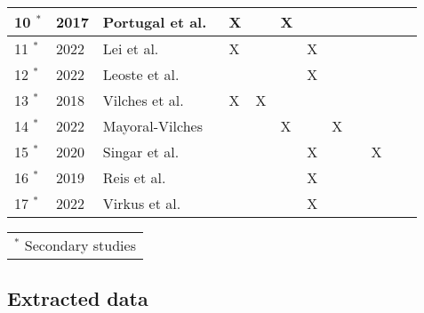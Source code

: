 \begin{table}[h]
\begin{tabularx}{\textwidth}{|l|l|X|l|l|l|l|l|l|l|l|l|}
    10 $^{\ast}$ & 2017          & Portugal et al.~\cite[]{role_of_security_in_human_robot_2017}               & X &  & X &  &  &  &  \\\hline
    11 $^{\ast}$ & 2022          & Lei et al.~\cite[]{acceptance_telepresence_robots_2022}                     & X          &            &            & X          &  &  &  \\\hline
    12 $^{\ast}$ & 2022          & Leoste et al.~\cite[]{higher_edu_perception_on_tprs_2022}                   &            &            &            & X &  &  &  \\\hline
    13 $^{\ast}$ & 2018          & Vilches et al.~\cite[]{robot_security_framework_2018}                       & X          & X          &            &            &            &            &            \\\hline
    14 $^{\ast}$ & 2022          & Mayoral-Vilches~\cite[]{robot_security_review_2022}                         &            &            & X          &            & X          &            &            \\\hline
    15 $^{\ast}$ & 2020          & Singar et al.~\cite[]{role_of_cyber_security_in_higher_edu_2020} &  &  &  & X &  &  & X \\\hline
    16 $^{\ast}$ & 2019          & Reis et al.~\cite[]{telepresence_robots_in_classroom_2019}                  &            &            &            & X &  &  &  \\\hline
    17 $^{\ast}$ & 2022          & Virkus et al.~\cite[]{telepresence_perspective_psychology_educational_2022} &  &  &  & X &  &  &  \\\hline
  \end{tabularx}
  \begin{tabularx}{\textwidth}{@{}l}
    \footnotesize{$^{\ast}$ Secondary studies}\\
  \end{tabularx}
\end{table}

\subsection{Extracted data}\label{subsec:extracted-data}

